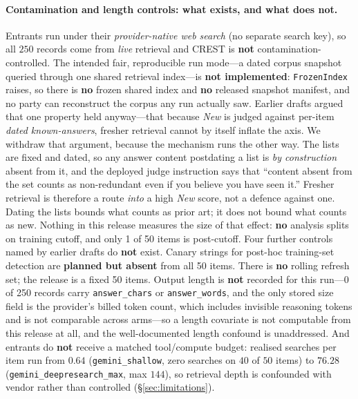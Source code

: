 \paragraph{Contamination and length controls: what exists, and what does not.} Entrants run under their \emph{provider-native web search} (no separate search key), so all $250$ records come from \emph{live} retrieval and CREST is \textbf{not} contamination-controlled. The intended fair, reproducible run mode---a dated corpus snapshot queried through one shared retrieval index---is \textbf{not implemented}: \texttt{FrozenIndex} raises, so there is \textbf{no} frozen shared index and \textbf{no} released snapshot manifest, and no party can reconstruct the corpus any run actually saw. Earlier drafts argued that one property held anyway---that because \emph{New} is judged against per-item \emph{dated known-answers}, fresher retrieval cannot by itself inflate the axis. We withdraw that argument, because the mechanism runs the other way. The lists are fixed and dated, so any answer content postdating a list is \emph{by construction} absent from it, and the deployed judge instruction says that ``content absent from the set counts as non-redundant even if you believe you have seen it.'' Fresher retrieval is therefore a route \emph{into} a high \emph{New} score, not a defence against one. Dating the lists bounds what counts as prior art; it does not bound what counts as new. Nothing in this release measures the size of that effect: \textbf{no} analysis splits on training cutoff, and only 1 of 50 items is post-cutoff. Four further controls named by earlier drafts do \textbf{not} exist. Canary strings for post-hoc training-set detection are \textbf{planned but absent} from all 50 items. There is \textbf{no} rolling refresh set; the release is a fixed 50 items. Output length is \textbf{not} recorded for this run---0 of 250 records carry \texttt{answer\_chars} or \texttt{answer\_words}, and the only stored size field is the provider's billed token count, which includes invisible reasoning tokens and is not comparable across arms---so a length covariate is not computable from this release at all, and the well-documented length confound is unaddressed. And entrants do \textbf{not} receive a matched tool/compute budget: realised searches per item run from $0.64$ (\texttt{gemini\_shallow}, zero searches on $40$ of $50$ items) to $76.28$ (\texttt{gemini\_deepresearch\_max}, max $144$), so retrieval depth is confounded with vendor rather than controlled (\S\ref{sec:limitations}).

